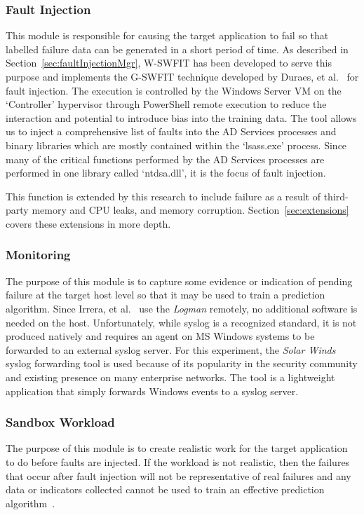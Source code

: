 \subsubsection{Fault Injection} \label{sec:faultInjectionTool} 
This module is responsible for causing the target application to fail so that
labelled failure data can be generated in a short period of time.  As described
in Section~\ref{sec:faultInjectionMgr}, \ac{W-SWFIT} has been developed to
serve this purpose and implements the \ac{G-SWFIT} technique developed by
Duraes, et al.~\cite{gswfit} for fault injection.  The execution is controlled
by the Windows Server \ac{VM} on the `Controller' hypervisor through PowerShell
remote execution to reduce the interaction and potential to introduce bias into
the training data.  The tool allows us to inject a comprehensive list of faults
into the \ac{AD} Services processes and binary libraries which are mostly
contained within the `lsass.exe' process.  Since many of the critical functions
performed by the \ac{AD} Services processes are performed in one library called
`ntdsa.dll', it is the focus of fault injection.

This function is extended by this research to include failure as a result of
third-party memory and \ac{CPU} leaks, and memory corruption.
Section~\ref{sec:extensions} covers these extensions in more depth.

\subsubsection{Monitoring} \label{sec:sandboxMonitoringTool} 
The purpose of this module is to capture some evidence or indication of pending
failure at the target host level so that it may be used to train a prediction
algorithm.  Since Irrera, et al.~\cite{irrera2015} use the \emph{Logman}
remotely, no additional software is needed on the host.  Unfortunately, while
syslog is a recognized standard, it is not produced natively and requires an
agent on \ac{MS} Windows systems to be forwarded to an external syslog server.
For this experiment, the \emph{Solar Winds} syslog forwarding tool is used
because of its popularity in the security community and existing presence on
many enterprise networks.  The tool is a lightweight application that
simply forwards Windows events to a syslog server.

\subsubsection{Sandbox Workload}  \label{sec:sandboxWorkload} 
The purpose of this module is to create realistic work for the target
application to do before faults are injected.  If the workload is not
realistic, then the failures that occur after fault injection will not be
representative of real failures and any data or indicators collected cannot be
used to train an effective prediction
algorithm~\cite{cotroneo2012,kikuchi2014,irrera2015}.

